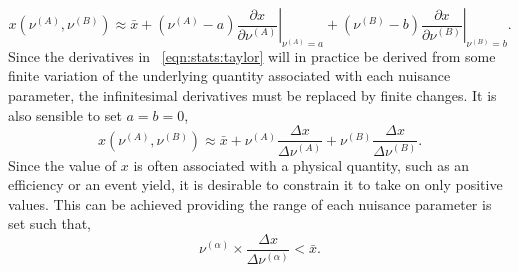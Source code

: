 \begin{equation}
\label{eqn:stats:taylor}
x(\nu^{(A)}, \nu^{(B)}) \approx \bar{x} +
(\nu^{(A)} - a)\left.\frac{\partial x}{\partial\nu^{(A)}}\right|_{\nu^{(A)}=a} +
(\nu^{(B)} - b)\left.\frac{\partial x}{\partial\nu^{(B)}}\right|_{\nu^{(B)}=b}.
\end{equation}
Since the derivatives in \eqn~\ref{eqn:stats:taylor} will in practice be
derived from some finite variation of the underlying quantity associated with
each nuisance parameter, the infinitesimal derivatives must be replaced by
finite changes. It is also sensible to set $a=b=0$,
\begin{equation}
\label{eqn:stats:taylor2}
x(\nu^{(A)}, \nu^{(B)}) \approx \bar{x} +
\nu^{(A)}\frac{\Delta x}{\Delta\nu^{(A)}} +
\nu^{(B)}\frac{\Delta x}{\Delta\nu^{(B)}}.
\end{equation}
Since the value of $x$ is often associated with a physical quantity, such as an
efficiency or an event yield, it is desirable to constrain it to take on only
positive values. This can be achieved providing the range of each nuisance
parameter is set such that,
\begin{equation*}
\nu^{(\alpha)}\times\frac{\Delta x}{\Delta \nu^{(\alpha)}} < \bar{x}.
\end{equation*}

